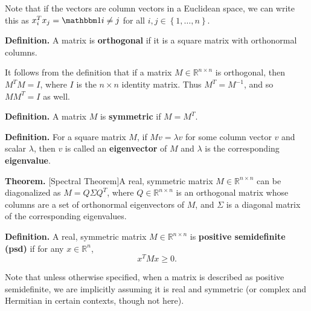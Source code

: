 \documentclass{article}
\theoremstyle{plain}
\theoremstyle{definition}
\begin{document}
Note that if the vectors are column vectors in a Euclidean space,
we can write this as $x_{i}^{T}x_{j}=\ind{i\neq j}$ for all $i,j\in\left\{ 1,\ldots,n\right\} $. 

{\bf Definition. }
A matrix is \textbf{orthogonal }if it is a square matrix with orthonormal
columns. 

It follows from the definition that if a matrix $M\in\mathbb{R}^{n\times n}$
is orthogonal, then $M^{T}M=I$, where $I$ is the $n\times n$ identity
matrix. Thus $M^{T}=M^{-1}$, and so $MM^{T}=I$ as well. 

{\bf Definition. }
A matrix $M$ is \textbf{symmetric }if $M=M^{T}$. 

{\bf Definition. }
For a square matrix $M$, if $Mv=\lambda v$ for some column vector
$v$ and scalar $\lambda$, then $v$ is called an \textbf{eigenvector}
of $M$ and $\lambda$ is the corresponding \textbf{eigenvalue}. 

{\bf Theorem. }
[Spectral Theorem]A real, symmetric matrix $M\in\mathbb{R}^{n\times n}$
can be diagonalized as $M=Q\Sigma Q^{T}$, where $Q\in\mathbb{R}^{n\times n}$
is an orthogonal matrix whose columns are a set of orthonormal eigenvectors
of $M$, and $\Sigma$ is a diagonal matrix of the corresponding eigenvalues. 

{\bf Definition. }
A real, symmetric matrix $M\in\mathbb{R}^{n\times n}$ is \textbf{positive
semidefinite (psd)} if for any $x\in\mathbb{R}^{n}$, 
\[
x^{T}Mx\ge0.
\]

Note that unless otherwise specified, when a matrix is described as
positive semidefinite, we are implicitly assuming it is real and symmetric
(or complex and Hermitian in certain contexts, though not here).
\end{document}
